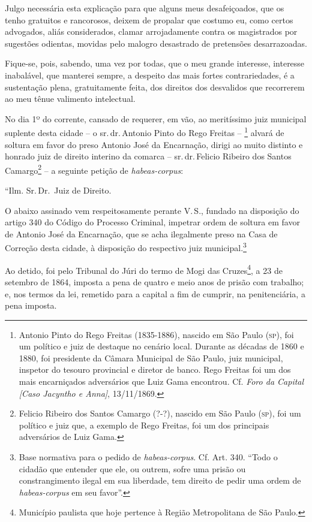 Julgo necessária esta explicação para que alguns meus desafeiçoados, que
os tenho gratuitos e rancorosos, deixem de propalar que costumo eu, como
certos advogados, aliás considerados, clamar arrojadamente contra os
magistrados por sugestões odientas, movidas pelo malogro desastrado de
pretensões desarrazoadas.

Fique-se, pois, sabendo, uma vez por todas, que o meu grande interesse,
interesse inabalável, que manterei sempre, a despeito das mais fortes
contrariedades, é a sustentação plena, gratuitamente feita, dos direitos
dos desvalidos que recorrerem ao meu tênue valimento intelectual.

\asterisc{}

No dia 1º do corrente, cansado de requerer, em vão, ao meritíssimo juiz
municipal suplente desta cidade -- o sr.\,dr.\,Antonio Pinto do Rego
Freitas -- \footnote{Antonio Pinto do Rego Freitas (1835-1886), nascido em
  São Paulo (\textsc{sp}), foi um político e juiz de destaque no cenário local.
  Durante as décadas de 1860 e 1880, foi presidente da Câmara Municipal
  de São Paulo, juiz municipal, inspetor do tesouro provincial e diretor
  de banco. Rego Freitas foi um dos mais encarniçados adversários que
  Luiz Gama encontrou. Cf. \emph{Foro da Capital {[}Caso Jacyntho e
  Anna{]}}, 13/11/1869.\label{rego}} alvará de soltura em favor do preso Antonio
José da Encarnação, dirigi ao muito distinto e honrado juiz de direito
interino da comarca -- sr.\,dr.\,Felicio Ribeiro dos Santos
Camargo\footnote{Felicio Ribeiro dos Santos Camargo (?-?), nascido em
  São Paulo (\textsc{sp}), foi um político e juiz que, a exemplo de Rego Freitas,
  foi um dos principais adversários de Luiz Gama.\label{felicio}} -- a seguinte petição
de \emph{habeas-corpus}:

``Ilm. Sr.\,Dr.~Juiz de Direito.

O abaixo assinado vem respeitosamente perante V.\,S., fundado na
disposição do artigo 340 do Código do Processo Criminal, impetrar ordem
de soltura em favor de Antonio José da Encarnação, que se acha
ilegalmente preso na Casa de Correção desta cidade, à disposição do
respectivo juiz municipal.\footnote{Base normativa para o pedido de
  \emph{habeas-corpus}. Cf. Art. 340. ``Todo o cidadão que entender que
  ele, ou outrem, sofre uma prisão ou constrangimento ilegal em sua
  liberdade, tem direito de pedir uma ordem de \emph{habeas-corpus} em
  seu favor''.}

Ao detido, foi pelo Tribunal do Júri do termo de Mogi das
Cruzes\footnote{Município paulista que hoje pertence à Região
  Metropolitana de São Paulo.}, a 23 de setembro de 1864, imposta a pena
de quatro e meio anos de prisão com trabalho; e, nos termos da lei,
remetido para a capital a fim de cumprir, na penitenciária, a pena
imposta.

